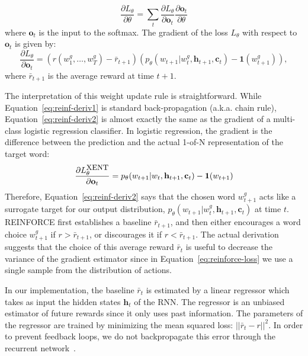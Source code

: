 \documentclass{article} \usepackage{iclr2016_conference,times}
\newcommand{\bh}{\mathbf{h}}
\newcommand{\bc}{\mathbf{c}}
\newcommand{\bone}{\mathbf{1}}
\newcommand{\bo}{\mathbf{o}}
\begin{document}
\begin{equation}
\frac{\partial L_{\theta}}{\partial \theta} = \sum_t \frac{\partial L_{\theta}}{\partial \bo_t}
\frac{\partial \bo_t}{\partial \theta} \label{eq:reinf-deriv1}
\end{equation}
where $\bo_t$ is the input to the softmax. 
The gradient of the loss $L_{\theta}$ with respect to $\bo_t$ is given by:
\begin{equation}
\frac{\partial L_{\theta}}{\partial \bo_t} = \left( r(w^g_1, \dots, w^g_T) - \bar{r}_{t+1} \right) \left( p_\theta(w_{t+1} | w^g_{t}, \bh_{t+1}, \bc_t) - \bone(w^g_{t+1}) \right),
 \label{eq:reinf-deriv2}
\end{equation}
where $\bar{r}_{t+1}$ is the average reward at time $t + 1$. 

The interpretation of this weight update rule is straightforward. While
Equation~\ref{eq:reinf-deriv1} is standard back-propagation (a.k.a. chain
rule), Equation~\ref{eq:reinf-deriv2} is almost exactly the same as the gradient of a multi-class logistic regression classifier. In logistic regression, the gradient is the difference between the prediction and the actual 1-of-N representation of the target word:
\begin{equation*}
\frac{\partial L^{\mbox{\small XENT}}_{\theta}}{\partial \bo_t} 
 =  p_\theta(w_{t+1} | w_{t}, \bh_{t+1}, \bc_t) - \bone(w_{t+1})
\end{equation*}
Therefore, Equation~\ref{eq:reinf-deriv2} says that the chosen word $w^g_{t+1}$
acts like a surrogate target for our output distribution,
$p_\theta(w_{t+1}|w^g_{t}, \bh_{t+1}, \bc_t)$ at time $t$. REINFORCE first establishes a baseline $\bar{r}_{t+1}$,
and then either encourages a word choice $w^g_{t+1}$ if $r > \bar{r}_{t+1}$, 
or discourages it if $r < \bar{r}_{t+1}$. The actual derivation suggests that the choice of this average reward $\bar{r}_t$ is useful to decrease the variance of the gradient estimator since in Equation~\ref{eq:reinforce-loss} we use a single sample from the distribution of actions. 

In our implementation, the baseline $\bar{r}_t$ is estimated by a linear regressor which takes as input the hidden states $\bh_t$ of the RNN. The regressor is an unbiased estimator of future rewards since it only uses past information. The parameters of the regressor are
trained by minimizing the mean squared loss: $||\bar{r}_t - r||^2$.
In order to prevent feedback loops, we do not backpropagate this error through
the recurrent network~\citep{zaremba-arxiv2015}. 
\end{document}
